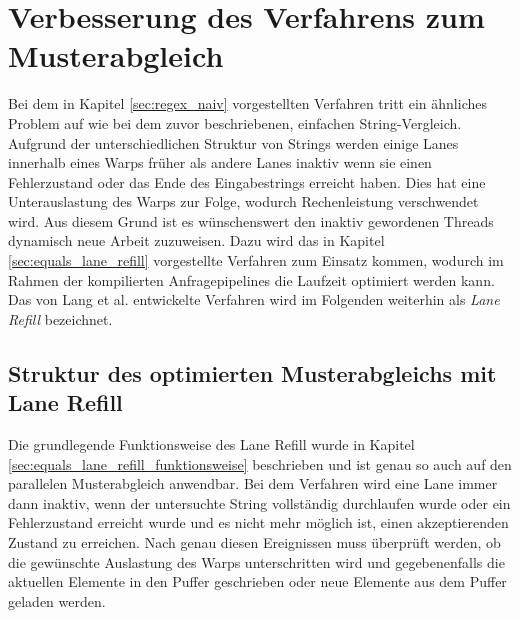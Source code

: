 \chapter{Verbesserung des Verfahrens zum Musterabgleich}

Bei dem in Kapitel \ref{sec:regex_naiv} vorgestellten Verfahren tritt ein ähnliches Problem auf wie bei dem zuvor beschriebenen, einfachen String-Vergleich.
Aufgrund der unterschiedlichen Struktur von Strings werden einige Lanes innerhalb eines Warps früher als andere Lanes inaktiv wenn sie einen Fehlerzustand oder das Ende des Eingabestrings erreicht haben.
Dies hat eine Unterauslastung des Warps zur Folge, wodurch Rechenleistung verschwendet wird.
Aus diesem Grund ist es wünschenswert den inaktiv gewordenen Threads dynamisch neue Arbeit zuzuweisen.
Dazu wird das in Kapitel \ref{sec:equals_lane_refill} vorgestellte Verfahren zum Einsatz kommen, wodurch im Rahmen der kompilierten Anfragepipelines die Laufzeit optimiert werden kann.
Das von Lang et al. entwickelte Verfahren \cite{Lang2018} wird im Folgenden weiterhin als \emph{Lane Refill} bezeichnet.


\section{Struktur des optimierten Musterabgleichs mit Lane Refill}

Die grundlegende Funktionsweise des Lane Refill wurde in Kapitel \ref{sec:equals_lane_refill_funktionsweise} beschrieben und ist genau so auch auf den parallelen Musterabgleich anwendbar.
Bei dem Verfahren wird eine Lane immer dann inaktiv, wenn der untersuchte String vollständig durchlaufen wurde oder ein Fehlerzustand erreicht wurde und es nicht mehr möglich ist, einen akzeptierenden Zustand zu erreichen.
Nach genau diesen Ereignissen muss überprüft werden, ob die gewünschte Auslastung des Warps unterschritten wird und gegebenenfalls die aktuellen Elemente in den Puffer geschrieben oder neue Elemente aus dem Puffer geladen werden.

\newpage

